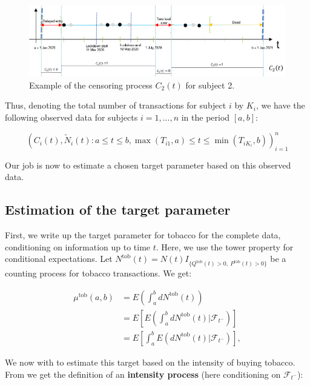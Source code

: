 \documentclass[
  11pt,
]{article}
\begin{document}
\begin{center}
\begin{figure}
\includegraphics[]{Censoring}
\caption{Example of the censoring process $C_2(t)$ for subject 2.}
\label{censoring}
\end{figure}
\end{center}

Thus, denoting the total number of transactions for subject \(i\) by
\(K_i\), we have the following observed data for subjects \(i=1,...,n\)
in the period \([a,b]\):

\[
(C_i(t), \tilde{N}_i(t): a \leq t \leq b, \max(T_{i1},a) \leq t \leq \min(T_{iK_i},b))_{i=1}^n
\]

Our job is now to estimate a chosen target parameter based on this
observed data.

\hypertarget{estimation-of-the-target-parameter}{%
\subsection{Estimation of the target
parameter}\label{estimation-of-the-target-parameter}}

First, we write up the target parameter for tobacco for the complete
data, conditioning on information up to time \(t\). Here, we use the
tower property for conditional expectations. Let
\(N^{\text{tob}}(t)=N(t) I_{\{Q^{\text{tob}}(t) > 0, \ P^{\text{tob}}(t) > 0 \}}\)
be a counting process for tobacco transactions. We get:

\begin{align*}
\mu^{\text{tob}}(a, b) &= E(\int_a^b dN^{\text{tob}}(t))\\ 
&= E \left[ E(\int_a^b dN^{\text{tob}}(t) | \mathcal{F}_{t^-}) \right] \\
&= E \left[\int_a^b E(dN^{\text{tob}}(t) | \mathcal{F}_{t^-}) \right],
\end{align*}

We now with to estimate this target based on the intensity of buying
tobacco. From \cite{gill84} we get the definition of an
\textbf{intensity process} (here conditioning on \(\mathcal{F}_{t^-}\)):
\end{document}
